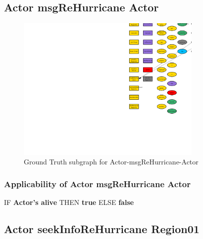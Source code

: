\documentclass{article}%
\begin{document}
%
\subsection{Actor msgReHurricane Actor}%
\label{subsec:Actor msgReHurricane Actor}%


\begin{figure}[ht]%
\centering%
\includegraphics[width=0.8\textwidth]{images/Actor-msgReHurricane-Actor.png}%
\caption{Ground Truth subgraph for Actor{-}msgReHurricane{-}Actor}%
\end{figure}

%
\subsubsection{Applicability of Actor msgReHurricane Actor}%
\label{ssubsec:Applicability of Actor msgReHurricane Actor}%
\begin{flushleft}%
IF %
\textbf{Actor's alive}%
\linebreak%
\hspace*{2em}%
THEN %
\textbf{true}%
\linebreak%
\hspace*{2em}%
ELSE %
\textbf{false}%
\end{flushleft}

%
\subsection{Actor seekInfoReHurricane Region01}%
\label{subsec:Actor seekInfoReHurricane Region01}%
\end{document}
